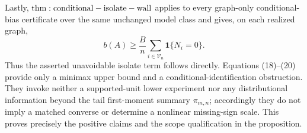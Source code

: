 Lastly, \({\rm thm:conditional-isolate-wall}\) applies to every graph-only conditional-bias certificate over the same unchanged model class and gives, on each realized graph,
\[
 b(A)\geq\frac{B}{n}
 \sum_{i\in\mathcal V_n}\mathbf1\{N_i=0\}.
\tag{20}
\]
Thus the asserted unavoidable isolate term follows directly.  Equations (18)--(20) provide only a minimax upper bound and a conditional-identification obstruction.  They invoke neither a supported-unit lower experiment nor any distributional information beyond the tail first-moment summary \(\pi_{m,n}\); accordingly they do not imply a matched converse or determine a nonlinear missing-sign scale.  This proves precisely the positive claims and the scope qualification in the proposition.